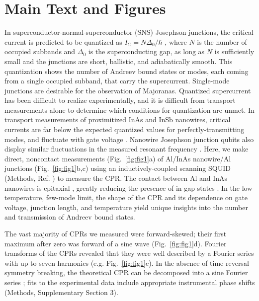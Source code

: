 \documentclass[11pt]{article}
\begin{document}
\section{Main Text and Figures}

In superconductor-normal-superconductor (SNS) Josephson junctions, the critical current is predicted to be quantized as $I_C = N\Delta_0 / \hbar$ , where $N$ is the number of occupied subbands and $\Delta_0$ is the superconducting gap, as long as $N$ is sufficiently small and the junctions are short, ballistic, and adiabatically smooth. This quantization shows the number of Andreev bound states or modes, each coming from a single occupied subband, that carry the supercurrent. Single-mode junctions are desirable for the observation of Majoranas.  Quantized supercurrent has been difficult to realize experimentally, and it is difficult from transport measurements alone to determine which conditions for quantization are unmet.  In transport measurements of proximitized InAs and InSb nanowires, critical currents are far below the expected quantized values for perfectly-transmitting modes, and fluctuate with gate voltage . Nanowire Josephson junction qubits also display similar fluctuations in the measured resonant frequency . 
Here, we make direct, noncontact measurements (Fig.~\ref{fig:fig1}a) of Al/InAs nanowire/Al junctions (Fig.~\ref{fig:fig1}b,c) using an inductively-coupled  scanning SQUID (Methods, Ref. ) to measure the CPR. The contact between Al and  InAs nanowires is epitaxial , greatly reducing the presence of in-gap states . In the low-temperature, few-mode limit, the shape of the CPR and its dependence on gate voltage, junction length, and temperature yield unique insights into the number and transmission of Andreev bound states.


The vast majority of CPRs we measured were forward-skewed; their first maximum after zero was forward of a sine wave (Fig.~\ref{fig:fig1}d). Fourier transforms of the CPRs revealed that they were well described by a Fourier series with up to seven harmonics (e.g. Fig.~\ref{fig:fig1}e). In the absence of time-reversal symmetry breaking, the theoretical CPR can be decomposed into a sine Fourier series ; fits to the experimental data include appropriate instrumental phase shifts (Methods, Supplementary Section 3).
\end{document}

